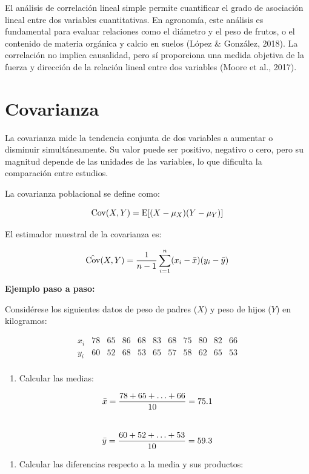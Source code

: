 \documentclass[
  spanish,
  letterpaper,
]{book}
\providecommand{\tightlist}{%
  \setlength{\itemsep}{0pt}\setlength{\parskip}{0pt}}
\begin{document}
El análisis de correlación lineal simple permite cuantificar el grado de
asociación lineal entre dos variables cuantitativas. En agronomía, este
análisis es fundamental para evaluar relaciones como el diámetro y el
peso de frutos, o el contenido de materia orgánica y calcio en suelos
(López \& González, 2018). La correlación no implica causalidad, pero sí
proporciona una medida objetiva de la fuerza y dirección de la relación
lineal entre dos variables (Moore et al., 2017).

\section{Covarianza}\label{covarianza}

La covarianza mide la tendencia conjunta de dos variables a aumentar o
disminuir simultáneamente. Su valor puede ser positivo, negativo o cero,
pero su magnitud depende de las unidades de las variables, lo que
dificulta la comparación entre estudios.

La covarianza poblacional se define como:

\[\LARGE \operatorname{Cov}(X, Y) = \mathrm{E}[(X - \mu_X)(Y - \mu_Y)] \]

El estimador muestral de la covarianza es:

\[\LARGE \hat{\operatorname{Cov}}(X, Y) = \frac{1}{n-1} \sum_{i=1}^{n} (x_i - \bar{x})(y_i - \bar{y}) \]

\textbf{Ejemplo paso a paso:}

Considérese los siguientes datos de peso de padres (\(X\)) y peso de
hijos (\(Y\)) en kilogramos:

\[\begin{array}{ccccccccccc}   
x_i & 78 & 65 & 86 & 68 & 83 & 68 & 75 & 80 & 82 & 66 \\   
y_i & 60 & 52 & 68 & 53 & 65 & 57 & 58 & 62 & 65 & 53 \\   
\end{array} \]\hspace{0pt}

\begin{enumerate}
\def\labelenumi{\arabic{enumi}.}
\tightlist
\item
  Calcular las medias:
\end{enumerate}

\[\LARGE \bar{x} = \frac{78 + 65 + \ldots + 66}{10} = 75.1\]\\
\[\LARGE \bar{y} = \frac{60 + 52 + \ldots + 53}{10} = 59.3\]

\begin{enumerate}
\def\labelenumi{\arabic{enumi}.}
\setcounter{enumi}{1}
\tightlist
\item
  Calcular las diferencias respecto a la media y sus productos:
\end{enumerate}
\end{document}
